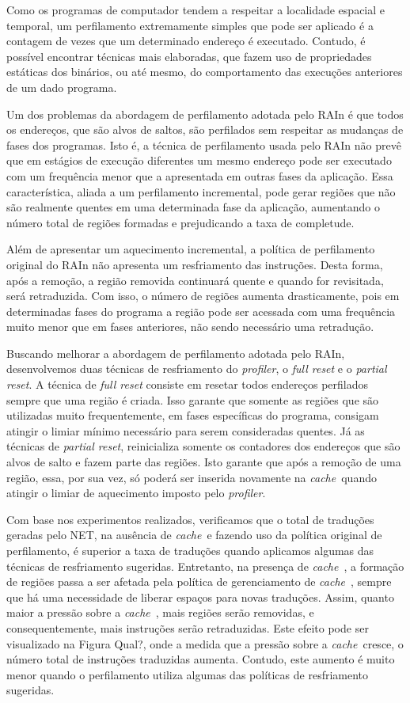 \documentclass[12pt,twoside]{article}
\newcommand{\cache}{\emph{cache}}
\begin{document}
Como os programas de computador tendem a respeitar a localidade espacial e temporal, um perfilamento extremamente simples que pode ser aplicado é a contagem de vezes que um determinado endereço é executado. Contudo, é possível encontrar técnicas mais elaboradas, que fazem uso de propriedades estáticas dos binários, ou até mesmo, do comportamento das execuções anteriores de um dado programa.

Um dos problemas da abordagem de perfilamento adotada pelo RAIn é que todos os endereços, que são alvos de saltos, são perfilados sem respeitar as mudanças de fases dos programas. Isto é, a técnica de perfilamento usada pelo RAIn não prevê que em estágios de execução diferentes um mesmo endereço pode ser executado com um frequência menor que a apresentada em outras fases da aplicação. Essa característica, aliada a um perfilamento incremental, pode gerar regiões que não são realmente quentes em uma determinada fase da aplicação, aumentando o número total de regiões formadas e prejudicando a taxa de completude.

Além de apresentar um aquecimento incremental, a política de perfilamento original do RAIn não apresenta um resfriamento das instruções. Desta forma, após a remoção, a região removida continuará quente e quando for revisitada, será retraduzida.  Com isso, o número de regiões aumenta drasticamente, pois em determinadas fases do programa a região pode ser acessada com uma frequência muito menor que em fases anteriores, não sendo necessário uma retradução.

Buscando melhorar a abordagem de perfilamento adotada pelo RAIn, desenvolvemos duas técnicas de resfriamento do \emph{profiler}, o \emph{full reset} e o \emph{partial reset}. A técnica de \emph{full reset} consiste em resetar todos endereços perfilados sempre que uma região é criada. Isso garante que somente as regiões que são utilizadas muito frequentemente, em fases específicas do programa, consigam atingir o limiar mínimo necessário para serem consideradas quentes. Já as técnicas de \emph{partial reset}, reinicializa somente os contadores dos endereços que são alvos de salto e fazem parte das regiões. Isto garante que após a remoção de uma região, essa, por sua vez, só  poderá ser inserida novamente na \cache~quando atingir o limiar de aquecimento imposto pelo \emph{profiler}.

Com base nos experimentos realizados, verificamos que o total de traduções geradas pelo NET, na ausência de \cache~e fazendo uso da política original de perfilamento, é superior a taxa de traduções quando aplicamos algumas das técnicas de resfriamento sugeridas. Entretanto, na presença de \cache~, a formação de regiões passa a ser afetada pela política de gerenciamento de \cache~, sempre que há uma necessidade de liberar espaços para novas traduções. Assim, quanto maior a pressão sobre a \cache~, mais regiões serão removidas, e consequentemente, mais instruções serão retraduzidas. Este efeito pode ser visualizado na Figura {\large Qual?}, onde a medida que a pressão sobre a \cache~cresce, o número total de instruções traduzidas aumenta. Contudo, este aumento é muito menor quando o perfilamento utiliza algumas das políticas de resfriamento sugeridas.
\end{document}
